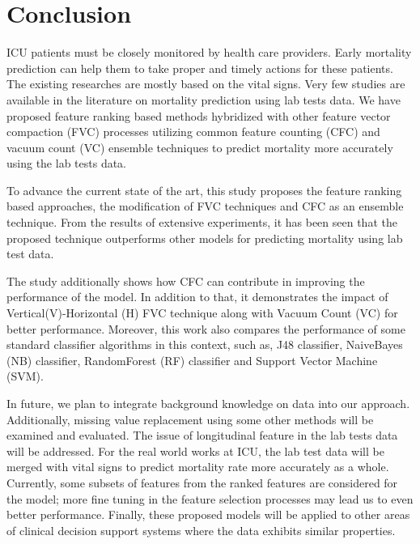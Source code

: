 \section{Conclusion} \label{s:conclusion}
ICU patients must be closely monitored by health care providers. Early mortality prediction can help them to take proper and timely actions for these patients. The existing researches are mostly based on the vital signs. Very few studies are available in the literature on mortality prediction using lab tests data. We have proposed feature ranking based methods hybridized with other feature vector compaction (FVC) processes utilizing common feature counting (CFC) and vacuum count (VC) ensemble techniques to predict mortality more accurately using the lab tests data. 
      
To advance the current state of the art, this study proposes the feature ranking based approaches, the modification of FVC techniques and CFC as an ensemble technique. From the results of extensive experiments, it has been seen that the proposed technique outperforms other models for predicting mortality using lab test data. 

The study additionally shows how CFC can contribute in improving the performance of the model. In addition to that, it demonstrates the impact of Vertical(V)-Horizontal (H) FVC technique along with Vacuum Count (VC) for better performance. Moreover, this work also compares the performance of some standard classifier algorithms in this context, such as, J48 classifier, NaiveBayes (NB) classifier, RandomForest (RF) classifier and Support Vector Machine (SVM).           
  
In future, we plan to integrate background knowledge on data into our approach. Additionally, missing value replacement using some other methods will be examined and evaluated. The issue of longitudinal feature in the lab tests data will be addressed. For the real world works at ICU, the lab test data will be merged with vital signs to predict mortality rate more accurately as a whole. Currently, some subsets of features from the ranked features are considered for the model; more fine tuning in the feature selection processes may lead us to even better performance. Finally, these proposed models will be applied to other areas of clinical decision support systems where the data exhibits similar properties.